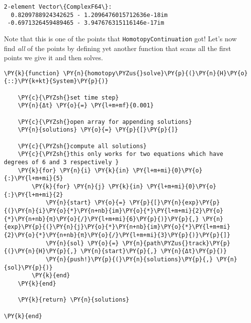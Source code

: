 \documentclass[11pt]{article}
\begin{document}
            \begin{tcolorbox}[breakable, size=fbox, boxrule=.5pt, pad at break*=1mm, opacityfill=0]
\begin{Verbatim}[commandchars=\\\{\}]
2-element Vector\{ComplexF64\}:
  0.8209788924342625 - 1.2096476015712636e-18im
 -0.6971326459489465 - 3.947676315116146e-17im
\end{Verbatim}
\end{tcolorbox}
        
    Note that this is one of the points that \texttt{HomotopyContinuation}
got! Let's now find \emph{all} of the points by defining yet another
function that scans all the first points we give it and then solves.

    \begin{tcolorbox}[breakable, size=fbox, boxrule=1pt, pad at break*=1mm,colback=cellbackground, colframe=cellborder]
\begin{Verbatim}[commandchars=\\\{\}]
\PY{k}{function} \PY{n}{homotopy\PYZus{}solve}\PY{p}{(}\PY{n}{H}\PY{o}{::}\PY{k+kt}{System}\PY{p}{)}

    \PY{c}{\PYZsh{}set time step}
    \PY{n}{Δt} \PY{o}{=} \PY{l+m+mf}{0.001}

    \PY{c}{\PYZsh{}open array for appending solutions}
    \PY{n}{solutions} \PY{o}{=} \PY{p}{[}\PY{p}{]}

    \PY{c}{\PYZsh{}compute all solutions}
    \PY{c}{\PYZsh{}this only works for two equations which have degrees of 6 and 3 respectively }
    \PY{k}{for} \PY{n}{i} \PY{k}{in} \PY{l+m+mi}{0}\PY{o}{:}\PY{l+m+mi}{5}
        \PY{k}{for} \PY{n}{j} \PY{k}{in} \PY{l+m+mi}{0}\PY{o}{:}\PY{l+m+mi}{2}
            \PY{n}{start} \PY{o}{=} \PY{p}{[}\PY{n}{exp}\PY{p}{(}\PY{n}{i}\PY{o}{*}\PY{n+nb}{im}\PY{o}{*}\PY{l+m+mi}{2}\PY{o}{*}\PY{n+nb}{π}\PY{o}{/}\PY{l+m+mi}{6}\PY{p}{)}\PY{p}{,} \PY{n}{exp}\PY{p}{(}\PY{n}{j}\PY{o}{*}\PY{n+nb}{im}\PY{o}{*}\PY{l+m+mi}{2}\PY{o}{*}\PY{n+nb}{π}\PY{o}{/}\PY{l+m+mi}{3}\PY{p}{)}\PY{p}{]}
            \PY{n}{sol} \PY{o}{=} \PY{n}{path\PYZus{}track}\PY{p}{(}\PY{n}{H}\PY{p}{,} \PY{n}{start}\PY{p}{,} \PY{n}{Δt}\PY{p}{)}
            \PY{n}{push!}\PY{p}{(}\PY{n}{solutions}\PY{p}{,} \PY{n}{sol}\PY{p}{)}
        \PY{k}{end}
    \PY{k}{end}

    \PY{k}{return} \PY{n}{solutions}

\PY{k}{end}
\end{Verbatim}
\end{tcolorbox}
\end{document}
